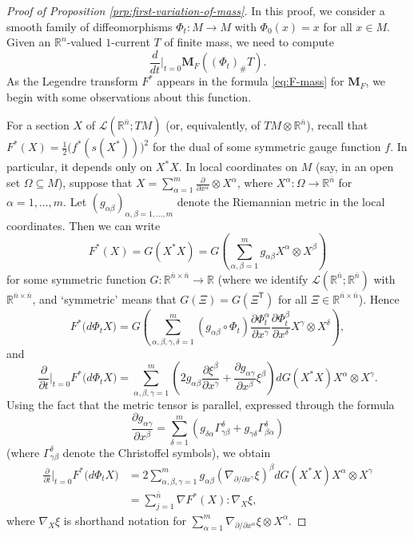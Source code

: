 \documentclass[10pt,a4paper]{amsart}
\newcommand{\R}{\mathbb{R}}
\newcommand{\M}{\mathbf{M}}
\newcommand{\ndim}{{\bar{n}}}
\newcommand{\Lin}{\mathcal{L}}
\newcommand{\transpose}{\mathsf{T}}
\newcommand{\dd}[2]{\frac{\partial #1}{\partial #2}}
\begin{document}
\begin{proof}[Proof of Proposition \ref{prp:first-variation-of-mass}]
In this proof, we consider a smooth family of diffeomorphisms $\Phi_t \colon M \to M$ with $\Phi_0(x) = x$ for all $x \in M$. Given an $\R^n$-valued $1$-current
$T$ of finite mass, we need to compute
\[
\frac{d}{dt}\Bigr|_{t = 0} \M_F((\Phi_t)_\# T).
\]
As the Legendre transform $F^*$ appears in the formula \eqref{eq:F-mass} for $\M_F$, we begin with
some observations about this function.

For a section $X$ of $\Lin(\R^\ndim; TM)$ (or, equivalently, of $TM \otimes \R^\ndim$), recall that $F^*(X) = \frac{1}{2} \bigl(f^*(s(X^*))\bigr)^2$ for the dual of some symmetric gauge function $f$. In particular, it depends only on $X^*X$.
In local coordinates on $M$ (say, in an open set $\Omega \subseteq M$), suppose that
$X = \sum_{\alpha = 1}^m \dd{}{x^\alpha} \otimes X^\alpha$, where $X^\alpha \colon \Omega \to \R^\ndim$ for $\alpha = 1, \dotsc, m$. Let
$(g_{\alpha\beta})_{\alpha, \beta = 1, \dotsc, m}$ denote the Riemannian metric in the local coordinates. Then we can write
\[
F^*(X) = G(X^*X) = G\left(\sum_{\alpha, \beta = 1}^m g_{\alpha\beta} X^\alpha \otimes X^\beta\right)
\]
for some symmetric function $G \colon \R^{\ndim \times \ndim} \to \R$ (where we identify $\Lin(\R^\ndim; \R^\ndim)$ with $\R^{\ndim \times \ndim}$, and
`symmetric' means that $G(\Xi) = G(\Xi^\transpose)$ for all $\Xi \in \R^{\ndim \times \ndim}$).
Hence
\[
F^*\bigl(d\Phi_t X\bigr) =  G\left(\sum_{\alpha, \beta, \gamma, \delta = 1}^m (g_{\alpha\beta} \circ \Phi_t) \dd{\Phi_t^\alpha}{x^\gamma} \dd{\Phi_t^\beta}{x^\delta} X^\gamma \otimes X^\delta\right),
\]
and
\[
\dd{}{t}\Bigr|_{t = 0} F^*\bigl(d\Phi_t X\bigr) = \sum_{\alpha, \beta, \gamma = 1}^m \left(2g_{\alpha\beta} \dd{\xi^\beta}{x^\gamma} + \dd{g_{\alpha\gamma}}{x^\beta} \xi^\beta\right) dG(X^*X) X^\alpha \otimes X^\gamma.
\]
Using the fact that the metric tensor is parallel, expressed through
the formula
\[
\dd{g_{\alpha\gamma}}{x^\beta} = \sum_{\delta = 1}^m (g_{\delta\alpha} \Gamma_{\gamma\beta}^\delta + g_{\gamma\delta} \Gamma_{\beta\alpha}^\delta)
\]
(where $\Gamma_{\gamma\beta}^\delta$ denote the Christoffel symbols), we obtain
\[
\begin{split}
\dd{}{t}\Bigr|_{t = 0} F^*\bigl(d\Phi_t X\bigr) & = 2 \sum_{\alpha, \beta, \gamma = 1}^m g_{\alpha\beta} (\nabla_{\partial/\partial x^\gamma}\xi)^\beta dG(X^*X) X^\alpha \otimes X^\gamma \\
& = \sum_{j = 1}^\ndim \nabla F^*(X) : \nabla_X \xi,
\end{split}
\]
where $\nabla_X \xi$ is shorthand notation for $\sum_{\alpha = 1}^m \nabla_{\partial/\partial x^\alpha} \xi \otimes X^\alpha$.


\end{proof}
\end{document}
